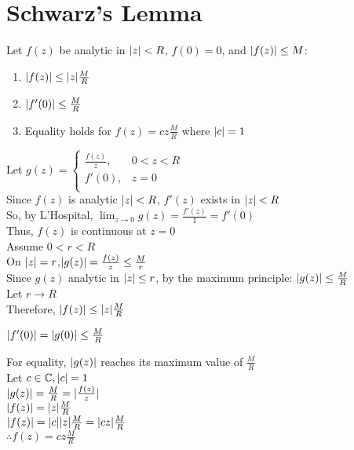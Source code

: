 \documentclass[letterpaper,12pt,fleqn]{article}
\begin{document}
\section*{Schwarz's Lemma}

\begin{theorem}
  Let $f(z)$ be analytic in $\lvert z\rvert<R$, $f(0)=0$, and $\lvert f(z)\rvert\le M$:
  \begin{enumerate}
  \item $\lvert f(z)\rvert\le\lvert z\rvert\frac{M}{R}$
  \item $\lvert f'(0)\rvert\le\frac{M}{R}$
  \item Equality holds for $f(z)=cz\frac{M}{R}$ where $\lvert c\rvert=1$
  \end{enumerate}
\end{theorem}

\begin{theproof}
  Let $g(z)=\begin{cases}
  \frac{f(z)}{z}, & 0<z<R \\
  f'(0), & z=0 \\
  \end{cases}$ \\
  Since $f(z)$ is analytic $\lvert z\rvert<R$, $f'(z)$ exists in $\lvert z\rvert<R$ \\
  So, by L'Hospital, $\lim_{z\to 0}g(z)=\frac{f'(z)}{1}=f'(0)$ \\
  Thus, $f(z)$ is continuous at $z=0$ \\
  Assume $0<r<R$ \\
  On $\lvert z\rvert=r$,$\lvert g(z)\rvert=\frac{f(z)}{z}\le\frac{M}{r}$ \\
  Since $g(z)$ analytic in $\lvert z\rvert\le r$, by the maximum principle:
  $\lvert g(z)\rvert\le\frac{M}{R}$ \\
  Let $r\to R$ \\
  Therefore, $\lvert f(z)\rvert\le\lvert z\rvert\frac{M}{R}$

  $\lvert f'(0)\rvert=\lvert g(0)\rvert\le\frac{M}{R}$

  For equality, $\lvert g(z)\rvert$ reaches its maximum value of $\frac{M}{R}$ \\
  Let $c\in\mathbb{C},\lvert c\rvert=1$ \\
  $\lvert g(z)\rvert=\frac{M}{R}=\lvert\frac{f(z)}{z}\rvert$ \\
  $\lvert f(z)\rvert=\lvert z\rvert\frac{M}{R}$ \\
  $\lvert f(z)\rvert=\lvert c\rvert\lvert z\rvert\frac{M}{R}=\lvert cz\rvert\frac{M}{R}$ \\
  $\therefore f(z)=cz\frac{M}{R}$
\end{theproof}
\end{document}
